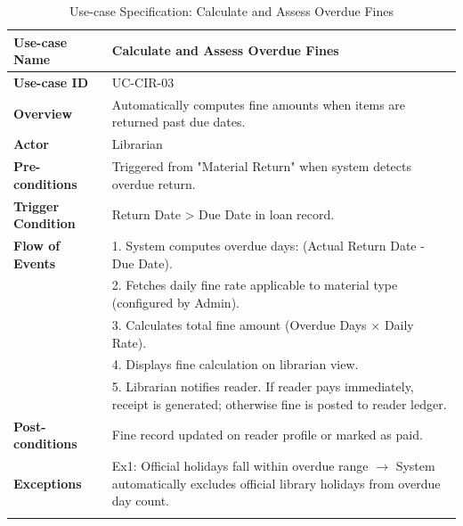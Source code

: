 \begin{longtable}{|p{3.5cm}|p{11.5cm}|}
    \hline
    \textbf{Use-case Name} & \textbf{Calculate and Assess Overdue Fines} \\
    \hline
    \textbf{Use-case ID} & UC-CIR-03 \\
    \hline
    \textbf{Overview} & Automatically computes fine amounts when items are returned past due dates. \\
    \hline
    \textbf{Actor} & Librarian \\
    \hline
    \textbf{Pre-conditions} & Triggered from "Material Return" when system detects overdue return. \\
    \hline
    \textbf{Trigger Condition} & Return Date > Due Date in loan record. \\
    \hline
    \textbf{Flow of Events} & 
    1. System computes overdue days: (Actual Return Date - Due Date).\\ 
 & 
    2. Fetches daily fine rate applicable to material type (configured by Admin).\\ 
 & 
    3. Calculates total fine amount (Overdue Days $\times$ Daily Rate).\\ 
 & 
    4. Displays fine calculation on librarian view.\\ 
 & 
    5. Librarian notifies reader. If reader pays immediately, receipt is generated; otherwise fine is posted to reader ledger. \\
    \hline
    \textbf{Post-conditions} & Fine record updated on reader profile or marked as paid. \\
    \hline
    \textbf{Exceptions} & 
    Ex1: Official holidays fall within overdue range $\rightarrow$ System automatically excludes official library holidays from overdue day count. \\
    \hline
    \caption{Use-case Specification: Calculate and Assess Overdue Fines} \\
\end{longtable}

